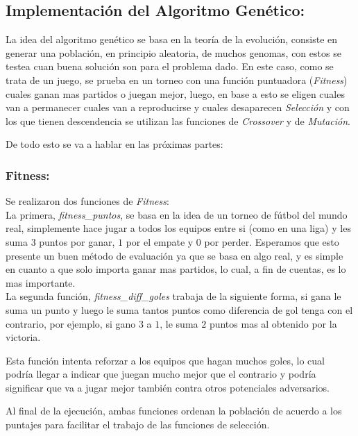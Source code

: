 \subsection{Implementación del Algoritmo Genético:}

La idea del algoritmo genético se basa en la teoría de la evolución, consiste en generar una población,
en principio aleatoria, de muchos genomas, con estos se testea cuan buena solución son para el problema dado.
En este caso, como se trata de un juego, se prueba en un torneo con una función puntuadora
(\emph{Fitness}) cuales ganan mas partidos o juegan mejor, luego, en base a esto se eligen cuales van a permanecer
cuales van a reproducirse y cuales desaparecen \emph{Selección} y con los que tienen descendencia se utilizan
las funciones de \emph{Crossover} y de \emph{Mutación}.

De todo esto se va a hablar en las próximas partes:
\subsubsection{Fitness:}

Se realizaron dos funciones de \emph{Fitness}:\\


La primera, \emph{fitness\_puntos}, se basa en la idea de un torneo de fútbol del mundo real, simplemente hace jugar a todos
los equipos entre si (como en una liga) y les suma $3$ puntos por ganar, $1$ por el empate y $0$ por perder.
Esperamos que esto presente un buen método de evaluación ya que se basa en algo real, y es simple en cuanto a que solo importa ganar
mas partidos, lo cual, a fin de cuentas, es lo mas importante.\\

La segunda función, \emph{fitness\_diff\_goles} trabaja de la siguiente forma, si gana le suma un punto y luego le suma tantos
puntos como diferencia de gol tenga con el contrario, por ejemplo, si gano $3$ a $1$, le suma $2$ puntos mas al obtenido por
la victoria.

Esta función intenta reforzar a los equipos que hagan muchos goles, lo cual podría llegar a indicar que juegan mucho mejor que el
contrario y podría significar que va a jugar mejor también contra otros potenciales adversarios.


Al final de la ejecución, ambas funciones ordenan la población de acuerdo a los puntajes para facilitar el trabajo de las funciones
de selección.


